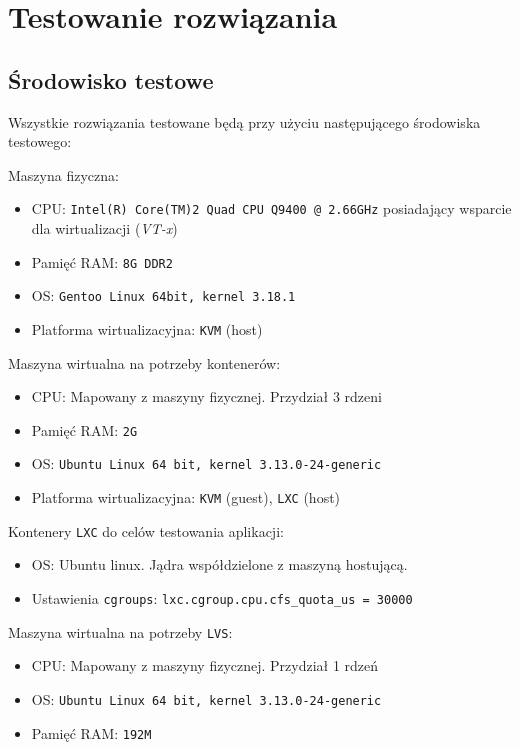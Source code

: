 \chapter{Testowanie rozwiązania}
\section{Środowisko testowe}
Wszystkie rozwiązania testowane będą przy użyciu następującego środowiska testowego:
\begin{description}
\item{Maszyna fizyczna:}
    \begin{itemize}
	\item CPU: \texttt{Intel(R) Core(TM)2 Quad CPU    Q9400 @ 2.66GHz} posiadający wsparcie dla wirtualizacji (\textit{VT-x})
	\item Pamięć RAM: \texttt{8G DDR2}
	\item OS: \texttt{Gentoo Linux 64bit, kernel 3.18.1}
	\item Platforma wirtualizacyjna: \texttt{KVM} (host)
    \end{itemize}
\item{Maszyna wirtualna na potrzeby kontenerów:}
    \begin{itemize}
	\item CPU: Mapowany z maszyny fizycznej. Przydział 3 rdzeni
	\item Pamięć RAM: \texttt{2G}
	\item OS: \texttt{Ubuntu Linux 64 bit, kernel 3.13.0-24-generic}
	\item Platforma wirtualizacyjna: \texttt{KVM} (guest), \texttt{LXC} (host)
    \end{itemize}
\item{Kontenery \texttt{LXC} do celów testowania aplikacji:}
    \begin{itemize}
	\item OS: Ubuntu linux. Jądra współdzielone z maszyną hostującą.
	\item Ustawienia \texttt{cgroups}: \texttt{lxc.cgroup.cpu.cfs\_quota\_us = 30000}
    \end{itemize}
\item{Maszyna wirtualna na potrzeby \texttt{LVS}:}
    \begin{itemize}
	\item CPU: Mapowany z maszyny fizycznej. Przydział 1 rdzeń
	\item OS: \texttt{Ubuntu Linux 64 bit, kernel 3.13.0-24-generic}
	\item Pamięć RAM: \texttt{192M}
    \end{itemize}
\end{description}
